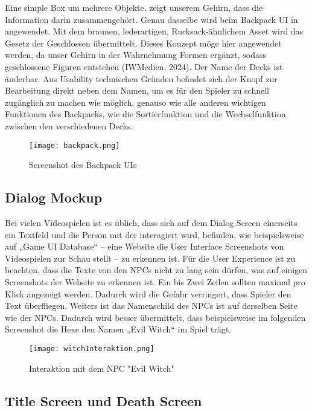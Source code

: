 Eine simple Box um mehrere Objekte, zeigt unserem Gehirn, dass die Information darin zusammengehört. Genau dasselbe wird beim Backpack UI in \FF angewendet. Mit dem braunen, lederartigen, Rucksack-ähnlichem Asset wird das Gesetz der Geschlossen übermittelt. Dieses Konzept möge hier angewendet werden, da unser Gehirn in der Wahrnehmung Formen ergänzt, sodass geschlossene Figuren entstehen  (IWMedien, 2024). Der Name der Decks ist änderbar. Aus Usability technischen Gründen befindet sich der Knopf zur Bearbeitung direkt neben dem Namen, um es für den Spieler zu schnell zugänglich zu machen wie möglich, genauso wie alle anderen wichtigen Funktionen des Backpacks, wie die Sortierfunktion und die Wechselfunktion zwischen den verschiedenen Decks.

\begin{figure}[H]
    \centering
    \texttt{[image: backpack.png]}
    \caption{Screenshot des Backpack UIs}
\end{figure}

\subsection{Dialog Mockup}

Bei vielen Videospielen ist es üblich, dass sich auf dem Dialog Screen einerseits ein Textfeld und die Person mit der interagiert wird, befinden, wie beispielsweise auf „Game UI Database“ – eine Website die User Interface Screenshots von Videospielen zur Schau stellt – zu erkennen ist. Für die User Experience ist zu beachten, dass die Texte von den NPCs nicht zu lang sein dürfen, was auf einigen Screenshots der Website zu erkennen ist. Ein bis Zwei Zeilen sollten maximal pro Klick angezeigt werden. Dadurch wird die Gefahr verringert, dass Spieler den Text überfliegen. Weiters ist das Namenschild des NPCs ist auf derselben Seite wie der NPCs. Dadurch wird besser übermittelt, dass beispielsweise im folgenden Screenshot die Hexe den Namen „Evil Witch“ im Spiel trägt.

\begin{figure}[H]
    \centering
    \texttt{[image: witchInteraktion.png]}
    \caption{Interaktion mit dem NPC "Evil Witch"}
\end{figure}

\subsection{Title Screen und Death Screen}

